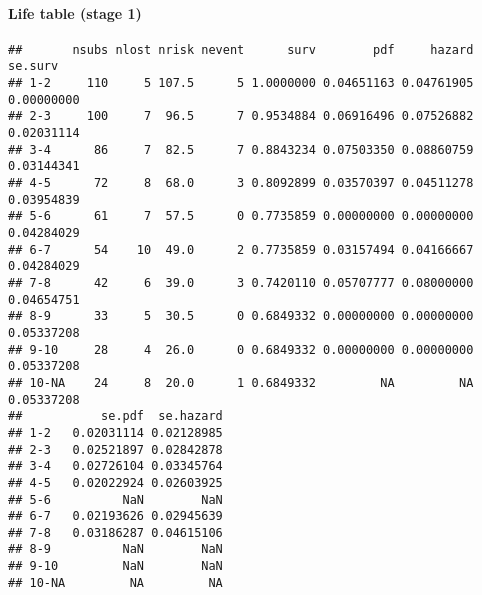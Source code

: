 \documentclass[]{article}
\newenvironment{Shaded}{\begin{snugshade}}{\end{snugshade}}
\newcommand{\KeywordTok}[1]{\textcolor[rgb]{0.13,0.29,0.53}{\textbf{#1}}}
\newcommand{\DataTypeTok}[1]{\textcolor[rgb]{0.13,0.29,0.53}{#1}}
\newcommand{\DecValTok}[1]{\textcolor[rgb]{0.00,0.00,0.81}{#1}}
\newcommand{\StringTok}[1]{\textcolor[rgb]{0.31,0.60,0.02}{#1}}
\newcommand{\OtherTok}[1]{\textcolor[rgb]{0.56,0.35,0.01}{#1}}
\newcommand{\OperatorTok}[1]{\textcolor[rgb]{0.81,0.36,0.00}{\textbf{#1}}}
\newcommand{\NormalTok}[1]{#1}
\let\oldparagraph\paragraph
\renewcommand{\paragraph}[1]{\oldparagraph{#1}\mbox{}}
\begin{document}
\paragraph{Life table (stage 1)}\label{life-table-stage-1}

\begin{Shaded}
\end{Shaded}

\begin{verbatim}
##       nsubs nlost nrisk nevent      surv        pdf     hazard    se.surv
## 1-2     110     5 107.5      5 1.0000000 0.04651163 0.04761905 0.00000000
## 2-3     100     7  96.5      7 0.9534884 0.06916496 0.07526882 0.02031114
## 3-4      86     7  82.5      7 0.8843234 0.07503350 0.08860759 0.03144341
## 4-5      72     8  68.0      3 0.8092899 0.03570397 0.04511278 0.03954839
## 5-6      61     7  57.5      0 0.7735859 0.00000000 0.00000000 0.04284029
## 6-7      54    10  49.0      2 0.7735859 0.03157494 0.04166667 0.04284029
## 7-8      42     6  39.0      3 0.7420110 0.05707777 0.08000000 0.04654751
## 8-9      33     5  30.5      0 0.6849332 0.00000000 0.00000000 0.05337208
## 9-10     28     4  26.0      0 0.6849332 0.00000000 0.00000000 0.05337208
## 10-NA    24     8  20.0      1 0.6849332         NA         NA 0.05337208
##           se.pdf  se.hazard
## 1-2   0.02031114 0.02128985
## 2-3   0.02521897 0.02842878
## 3-4   0.02726104 0.03345764
## 4-5   0.02022924 0.02603925
## 5-6          NaN        NaN
## 6-7   0.02193626 0.02945639
## 7-8   0.03186287 0.04615106
## 8-9          NaN        NaN
## 9-10         NaN        NaN
## 10-NA         NA         NA
\end{verbatim}
\end{document}
